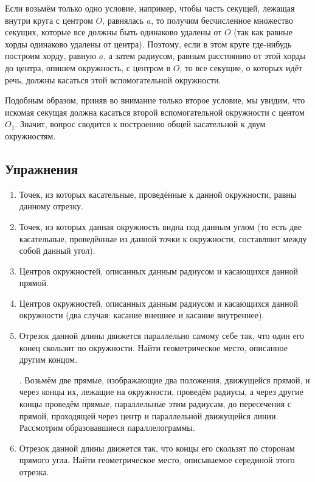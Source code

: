 \documentclass[oneside]{book}
\begin{document}

Если возьмём только одно условие, например, чтобы часть секущей, лежащая внутри круга  с центром $O$, равнялась $a$, то получим бесчисленное множество секущих, которые все должны быть одинаково удалены от $O$ (так как равные хорды одинаково удалены от центра).
Поэтому, если в этом круге где-нибудь построим хорду, равную $a$, а затем радиусом, равным расстоянию от этой хорды до центра, опишем окружность, с центром в $O$, то все секущие, о которых идёт речь, должны касаться этой вспомогательной окружности.

Подобным образом, приняв во внимание только второе условие, мы увидим, что искомая секущая должна касаться второй вспомогательной окружности с центом $O_1$.
Значит, вопрос сводится к построению общей касательной к двум окружностям.

\subsection*{Упражнения}

\begin{center}
\end{center}

\begin{enumerate}

 \item
Точек, из которых касательные, проведённые к данной окружности, равны данному отрезку.

 \item
Точек, из которых данная окружность видна под данным углом (то есть две касательные, проведённые из данной точки к окружности, составляют между собой данный угол).

 \item
Центров окружностей, описанных данным радиусом и касающихся данной прямой.

 \item
Центров окружностей, описанных данным радиусом и касающихся данной окружности (два случая:
касание внешнее и касание внутреннее).

 \item
Отрезок данной длины движется параллельно самому себе так, что один его конец скользит по окружности.
Найти геометрическое место, описанное другим концом.

\smallskip
{}.
Возьмём две прямые, изображающие два положения, движущейся прямой, и через концы их, лежащие на окружности, проведём радиусы, а через другие концы проведём прямые, параллельные этим радиусам, до пересечения с прямой, проходящей через центр и параллельной движущейся линии.
Рассмотрим образовавшиеся параллелограммы.

 \item
Отрезок данной длины движется так, что концы его скользят по сторонам прямого угла.
Найти геометрическое место, описываемое серединой этого отрезка.

\end{enumerate}
\end{document}
